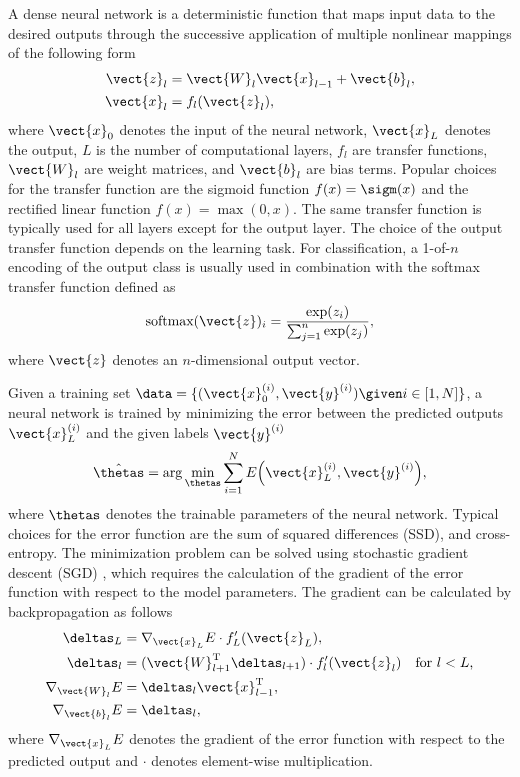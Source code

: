A dense neural network is a deterministic function that maps input data to the
desired outputs through the successive application of multiple nonlinear
mappings of the following form
\begin{align}
\vect{z}_l &= \vect{W}_l\vect{x}_{l-1} + \vect{b}_l, \\
\vect{x}_l &= f_l(\vect{z}_l),
\end{align}
where $\vect{x}_0$ denotes the input of the neural network, $\vect{x}_L$ denotes
the output, $L$ is the number of computational layers, $f_l$ are transfer
functions, $\vect{W}_l$ are weight matrices, and $\vect{b}_l$ are bias terms.
Popular choices for the transfer function are the sigmoid function $f(x) =
\sigm(x)$ and the rectified linear function $f(x) = \max(0, x)$. The same
transfer function is typically used for all layers except for the output layer.
The choice of the output transfer function depends on the learning task. For
classification, a 1-of-$n$ encoding of the output class is usually used in
combination with the softmax transfer function defined as
\begin{equation}
\text{softmax}(\vect{z})_i = \frac{\exp(z_i)}{\sum_{j=1}^n \exp(z_j)},
\end{equation}
where $\vect{z}$ denotes an $n$-dimensional output vector.

Given a training set $\data = \{(\vect{x}_0^{(i)}, \vect{y}^{(i)})\given i
\in [1, N] \}$, a neural network is trained by minimizing the error
between the predicted outputs $\vect{x}_L^{(i)}$ and the given labels
$\vect{y}^{(i)}$
\begin{equation}
\hat{\thetas} = \arg\min_{\thetas} \sum_{i = 1}^N E\Big(\vect{x}_L^{(i)},
\vect{y}^{(i)}\Big),
\end{equation}
where $\thetas$ denotes the trainable parameters of the neural network. Typical
choices for the error function are the sum of squared differences (SSD), and
cross-entropy.
The minimization problem can be solved using stochastic gradient descent (SGD)
\citep{Rumelhart1986,polyak1992}, which requires the calculation of the gradient
of the error function with respect to the model parameters. The gradient can be
calculated by backpropagation \citep{werbos1974} as follows
\begin{align}
\deltas_L &= \nabla_{\vect{x}_L}E \cdot f_L'(\vect{z}_L), \\
\deltas_l &= (\vect{W}_{l+1}^\text{T}\deltas_{l+1}) \cdot
f_l'(\vect{z}_l) & \text{for $l < L$,}\\
\nabla_{\vect{W}_l}E &= \deltas_l\vect{x}_{l-1}^\text{T}, \\
\nabla_{\vect{b}_l}E &= \deltas_l,
\end{align}
where $\nabla_{\vect{x}_L}E$ denotes the gradient of the error function with
respect to the predicted output and $\cdot$ denotes element-wise multiplication.

